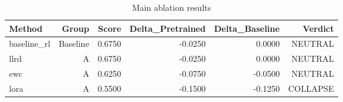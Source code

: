 \begin{table}[htbp]
\centering
\caption{Main ablation results}
\label{tab:main-results}
\begin{tabular}{lrrrrr}
\toprule
\textbf{Method} & \textbf{Group} & \textbf{Score} & \textbf{Delta\_Pretrained} & \textbf{Delta\_Baseline} & \textbf{Verdict} \\
\midrule
baseline\_rl & Baseline & 0.6750 & -0.0250 & 0.0000 & NEUTRAL \\
llrd & A & 0.6750 & -0.0250 & 0.0000 & NEUTRAL \\
ewc & A & 0.6250 & -0.0750 & -0.0500 & NEUTRAL \\
lora & A & 0.5500 & -0.1500 & -0.1250 & COLLAPSE \\
\bottomrule
\end{tabular}
\end{table}